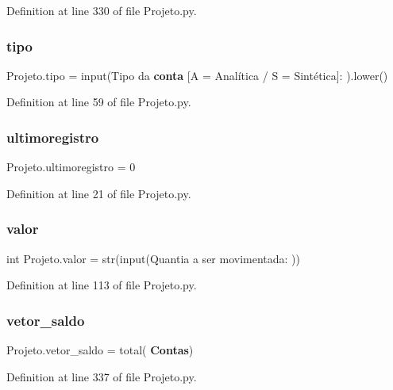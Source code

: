 Definition at line 330 of file Projeto.\+py.

\mbox{\label{namespace_projeto_ae7ed8df281a628fe6ee6e934ceb95e0d}} 
\subsubsection{tipo}
{\footnotesize\ttfamily Projeto.\+tipo = input(\textquotesingle{}Tipo da \textbf{ conta} [A = Analítica / S = Sintética]\+: \textquotesingle{}).lower()}



Definition at line 59 of file Projeto.\+py.

\mbox{\label{namespace_projeto_aa330b039b98b823b4fb42f80dbedea28}} 
\subsubsection{ultimoregistro}
{\footnotesize\ttfamily Projeto.\+ultimoregistro = 0}



Definition at line 21 of file Projeto.\+py.

\mbox{\label{namespace_projeto_a4c71b8d48ad553f362be9c8b97aaf38a}} 
\subsubsection{valor}
{\footnotesize\ttfamily int Projeto.\+valor = str(input(\textquotesingle{}Quantia a ser movimentada\+: \textquotesingle{}))}



Definition at line 113 of file Projeto.\+py.

\mbox{\label{namespace_projeto_a35175d061067fc4e5b9a1ebef1167cd5}} 
\subsubsection{vetor\_saldo}
{\footnotesize\ttfamily Projeto.\+vetor\+\_\+saldo = total(\textbf{ Contas})}



Definition at line 337 of file Projeto.\+py.

